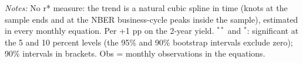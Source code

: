 \begin{flushleft}\footnotesize\textit{Notes:} No r* measure: the trend is a natural cubic spline in time (knots at the sample ends and at the NBER business-cycle peaks inside the sample), estimated in every monthly equation. Per +1 pp on the 2-year yield. $^{**}$ and $^{*}$: significant at the 5 and 10 percent levels (the 95\% and 90\% bootstrap intervals exclude zero); 90\% intervals in brackets. Obs = monthly observations in the equations.\end{flushleft}
\endgroup
